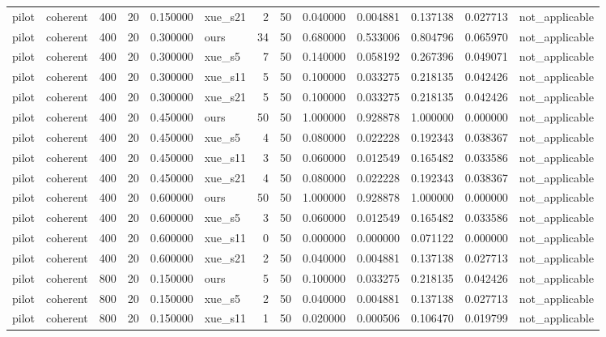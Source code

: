 \begin{longtable}{llrrrlrrrrrrl}
pilot & coherent & 400 & 20 & 0.150000 & xue\_s21 & 2 & 50 & 0.040000 & 0.004881 & 0.137138 & 0.027713 & not\_applicable \\
pilot & coherent & 400 & 20 & 0.300000 & ours & 34 & 50 & 0.680000 & 0.533006 & 0.804796 & 0.065970 & not\_applicable \\
pilot & coherent & 400 & 20 & 0.300000 & xue\_s5 & 7 & 50 & 0.140000 & 0.058192 & 0.267396 & 0.049071 & not\_applicable \\
pilot & coherent & 400 & 20 & 0.300000 & xue\_s11 & 5 & 50 & 0.100000 & 0.033275 & 0.218135 & 0.042426 & not\_applicable \\
pilot & coherent & 400 & 20 & 0.300000 & xue\_s21 & 5 & 50 & 0.100000 & 0.033275 & 0.218135 & 0.042426 & not\_applicable \\
pilot & coherent & 400 & 20 & 0.450000 & ours & 50 & 50 & 1.000000 & 0.928878 & 1.000000 & 0.000000 & not\_applicable \\
pilot & coherent & 400 & 20 & 0.450000 & xue\_s5 & 4 & 50 & 0.080000 & 0.022228 & 0.192343 & 0.038367 & not\_applicable \\
pilot & coherent & 400 & 20 & 0.450000 & xue\_s11 & 3 & 50 & 0.060000 & 0.012549 & 0.165482 & 0.033586 & not\_applicable \\
pilot & coherent & 400 & 20 & 0.450000 & xue\_s21 & 4 & 50 & 0.080000 & 0.022228 & 0.192343 & 0.038367 & not\_applicable \\
pilot & coherent & 400 & 20 & 0.600000 & ours & 50 & 50 & 1.000000 & 0.928878 & 1.000000 & 0.000000 & not\_applicable \\
pilot & coherent & 400 & 20 & 0.600000 & xue\_s5 & 3 & 50 & 0.060000 & 0.012549 & 0.165482 & 0.033586 & not\_applicable \\
pilot & coherent & 400 & 20 & 0.600000 & xue\_s11 & 0 & 50 & 0.000000 & 0.000000 & 0.071122 & 0.000000 & not\_applicable \\
pilot & coherent & 400 & 20 & 0.600000 & xue\_s21 & 2 & 50 & 0.040000 & 0.004881 & 0.137138 & 0.027713 & not\_applicable \\
pilot & coherent & 800 & 20 & 0.150000 & ours & 5 & 50 & 0.100000 & 0.033275 & 0.218135 & 0.042426 & not\_applicable \\
pilot & coherent & 800 & 20 & 0.150000 & xue\_s5 & 2 & 50 & 0.040000 & 0.004881 & 0.137138 & 0.027713 & not\_applicable \\
pilot & coherent & 800 & 20 & 0.150000 & xue\_s11 & 1 & 50 & 0.020000 & 0.000506 & 0.106470 & 0.019799 & not\_applicable \\

\end{longtable}
